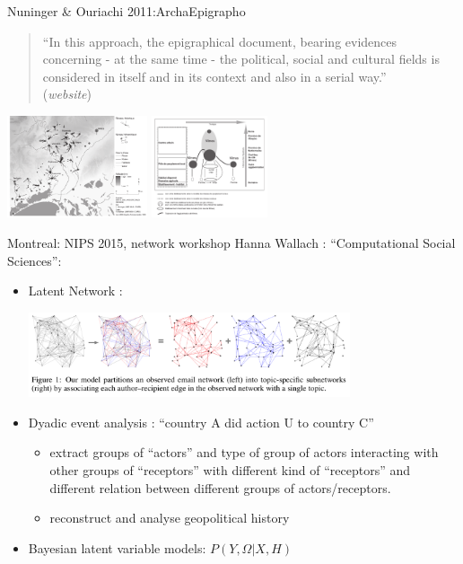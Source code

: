 \documentclass[9pt, handout=show,notes=show]{beamer}
\begin{document}
\begin{frame}{Nuninger \& Ouriachi 2011:ArchaEpigrapho}
    \begin{quotation}
	``In this approach, the epigraphical document, bearing evidences concerning - at the same time - the  political, social and cultural fields is considered in itself and in its context and also in a serial way.''
	\\(\emph{website})
    \end{quotation}
    \begin{center}
	\includegraphics[height=3cm]{images/hierarchi.png}
	\hfil \includegraphics[height=3cm]{images/hierarchyTime.png}
    \end{center}
    
\end{frame}

\begin{frame}{Montreal: NIPS 2015, network workshop}
 Hanna Wallach : ``Computational Social Sciences'':\\

 \begin{itemize}
     \item Latent Network :
	 \begin{center}
	     \includegraphics[height=2.5cm]{images/mailnet.png}
	 \end{center}
     \item Dyadic event analysis : ``country A did action U to country C''\\
	 \begin{itemize}
	     \item extract groups of ``actors'' and type of group of actors interacting with other groups of ``receptors'' with different kind of ``receptors'' and different relation between different groups of actors/receptors.
	     \item reconstruct and analyse geopolitical history
	   
	 \end{itemize}
     \item Bayesian latent variable models: $P(Y,\Omega | X,H)$
 \end{itemize}


    
\end{frame}
\end{document}
